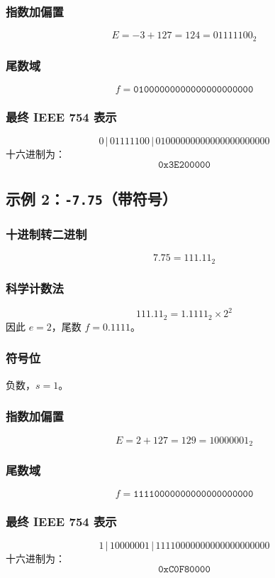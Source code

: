 \subsubsection*{指数加偏置}
\[
E = -3 + 127 = 124 = 01111100_2
\]

\subsubsection*{尾数域}
\[
f = \texttt{01000000000000000000000}
\]

\subsubsection*{最终 IEEE 754 表示}
\[
0 \,|\, 01111100 \,|\, 01000000000000000000000
\]
十六进制为：
\[
\texttt{0x3E200000}
\]

\subsection{示例 2：\texttt{-7.75}（带符号）}

\subsubsection*{十进制转二进制}
\[
7.75 = 111.11_2
\]

\subsubsection*{科学计数法}
\[
111.11_2 = 1.1111_2 \times 2^2
\]
因此 $e=2$，尾数 $f=0.1111$。

\subsubsection*{符号位}
负数，$s=1$。

\subsubsection*{指数加偏置}
\[
E = 2+127 = 129 = 10000001_2
\]

\subsubsection*{尾数域}
\[
f = \texttt{11110000000000000000000}
\]

\subsubsection*{最终 IEEE 754 表示}
\[
1 \,|\, 10000001 \,|\, 11110000000000000000000
\]
十六进制为：
\[
\texttt{0xC0F80000}
\]

